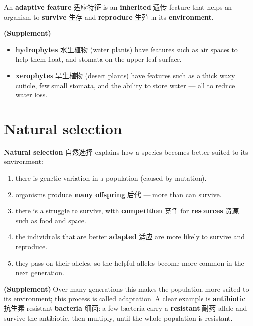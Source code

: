 \documentclass[11pt]{article}
\begin{document}
An \textbf{adaptive feature} 适应特征 is an \textbf{inherited} 遗传 feature that helps an organism to \textbf{survive} 生存 and \textbf{reproduce} 生殖 in its \textbf{environment}.

\textbf{(Supplement)}

\begin{itemize}
\item \textbf{hydrophytes} 水生植物 (water plants) have features such as air spaces to help them float, and stomata on the upper leaf surface.

\item \textbf{xerophytes} 旱生植物 (desert plants) have features such as a thick waxy cuticle, few small stomata, and the ability to store water — all to reduce water loss.

\end{itemize}

\section*{Natural selection}

\textbf{Natural selection} 自然选择 explains how a species becomes better suited to its environment:

\begin{enumerate}
\item there is genetic variation in a population (caused by mutation).

\item organisms produce \textbf{many offspring} 后代 — more than can survive.

\item there is a struggle to survive, with \textbf{competition} 竞争 for \textbf{resources} 资源 such as food and space.

\item the individuals that are better \textbf{adapted} 适应 are more likely to survive and reproduce.

\item they pass on their alleles, so the helpful alleles become more common in the next generation.

\end{enumerate}

\textbf{(Supplement)} Over many generations this makes the population more suited to its environment; this process is called adaptation. A clear example is \textbf{antibiotic} 抗生素-resistant \textbf{bacteria} 细菌: a few bacteria carry a \textbf{resistant} 耐药 allele and survive the antibiotic, then multiply, until the whole population is resistant.
\end{document}
